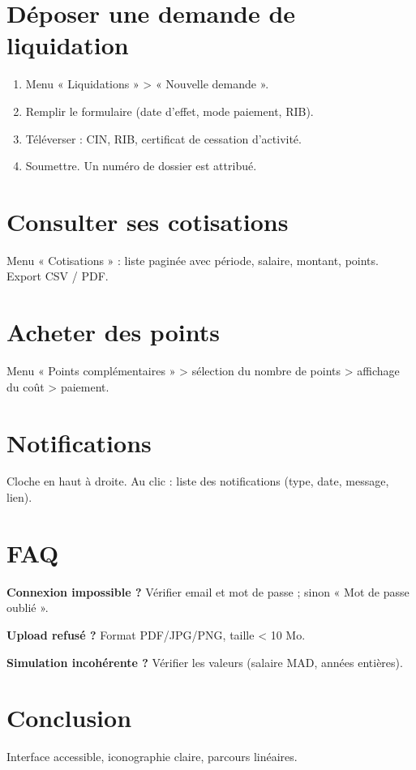 \documentclass[12pt,a4paper,oneside]{report}
\begin{document}
\section{Déposer une demande de liquidation}
\begin{enumerate}
    \item Menu « Liquidations » \textgreater{} « Nouvelle demande ».
    \item Remplir le formulaire (date d'effet, mode paiement, RIB).
    \item Téléverser : CIN, RIB, certificat de cessation d'activité.
    \item Soumettre. Un numéro de dossier est attribué.
\end{enumerate}

\section{Consulter ses cotisations}
Menu « Cotisations » : liste paginée avec période, salaire, montant, points. Export CSV / PDF.

\section{Acheter des points}
Menu « Points complémentaires » \textgreater{} sélection du nombre de points \textgreater{} affichage du coût \textgreater{} paiement.

\section{Notifications}
Cloche en haut à droite. Au clic : liste des notifications (type, date, message, lien).

\section{FAQ}
\textbf{Connexion impossible ?} Vérifier email et mot de passe ; sinon « Mot de passe oublié ».

\textbf{Upload refusé ?} Format PDF/JPG/PNG, taille \textless{} 10 Mo.

\textbf{Simulation incohérente ?} Vérifier les valeurs (salaire MAD, années entières).

\section{Conclusion}
Interface accessible, iconographie claire, parcours linéaires.
\end{document}

